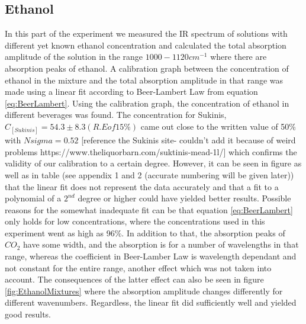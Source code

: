 \documentclass[reprint,amsmath,amssymb,aps, prl]{revtex4-2}
\begin{document}
\subsection{Ethanol}
In this part of the experiment we measured the IR spectrum of solutions with different yet known ethanol concentration and calculated the total absorption amplitude of the solution in the range $1000-1120 cm^{-1}$ where there are absorption peaks of ethanol. A calibration graph between the concentration of ethanol in the mixture and the total absorption amplitude in that range was made using a linear fit according to Beer-Lambert Law from equation \ref{eq:BeerLambert}.
Using the calibration graph, the concentration of ethanol in different beverages was found. The concentration for Sukinis, $C_[Sukinis]=54.3\pm8.3 (R.E of 15\%)$ came out close to the written value of 50\% with $N{sigma}=0.52$  [reference the Sukinis site- couldn't add it because of weird problems https://www.theliquorbarn.com/suktinis-mead-1l/] which confirms the validity of our calibration to a certain degree. However, it can be seen in figure %
as well as in table 
(see appendix 1 and 2 (accurate numbering will be given later)) that the linear fit does not represent the data accurately and that a fit to a polynomial of a $2^{nd}$ degree or higher could have yielded better results. Possible reasons for the somewhat inadequate fit can be that equation \ref{eq:BeerLambert} only holds for low concentrations, where the concentrations used in this experiment went as high as 96\%. In addition to that, the absorption peaks of $CO_{2}$ have some width, and the absorption is for a number of wavelengths in that range, whereas the coefficient in Beer-Lamber Law is wavelength dependant and not constant for the entire range, another effect which was not taken into account. The consequences of the latter effect can also be seen in figure \ref{fig:EthanolMixtures} where the absorption amplitude changes differently for different wavenumbers. Regardless, the linear fit did sufficiently well and yielded good results.
\end{document}
